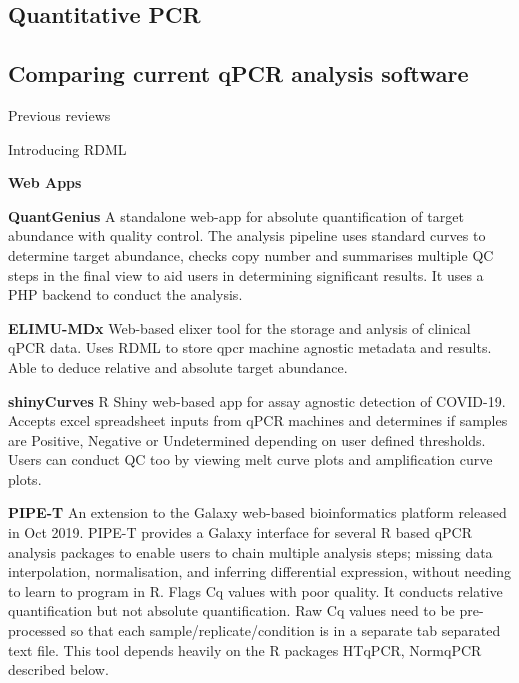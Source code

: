 \documentclass{SBCbookchapter}
\begin{document}


\subsection{Quantitative PCR}

\subsection{Comparing current qPCR analysis software}

Previous reviews \cite{Rodiger2015, Pabinger2014}

Introducing RDML \cite{Rodiger2017}



\textbf{Web Apps}

\textbf{QuantGenius} A standalone web-app for absolute quantification of target abundance with quality control. The analysis pipeline uses standard curves to determine target abundance, checks copy number and summarises multiple QC steps in the final view to aid users in determining significant results. It uses a PHP backend to conduct the analysis.   \cite{Baebler2017}

\textbf{ELIMU-MDx} Web-based elixer tool for the storage and anlysis of clinical qPCR data. Uses RDML to store qpcr machine agnostic metadata and results. Able to deduce relative and absolute target abundance.  \cite{Krahenbuhl2019}

\textbf{shinyCurves} R Shiny web-based app for assay agnostic detection of COVID-19. Accepts excel spreadsheet inputs from qPCR machines and determines if samples are Positive, Negative or Undetermined depending on user defined thresholds. Users can conduct QC too by viewing melt curve plots and amplification curve plots. \cite{OlaecheaLazaro2021}

\textbf{PIPE-T} An extension to the Galaxy web-based bioinformatics platform released in Oct 2019. PIPE-T provides a Galaxy interface for several R based qPCR analysis packages to enable users to chain multiple analysis steps; missing data interpolation, normalisation, and inferring differential expression, without needing to learn to program in R. Flags Cq values with poor quality. It conducts relative quantification but not absolute quantification. Raw Cq values need to be pre-processed so that each sample/replicate/condition is in a separate tab separated text file.  This tool depends heavily on the R packages HTqPCR, NormqPCR described below. \cite{Zanardi2019}
\end{document}
